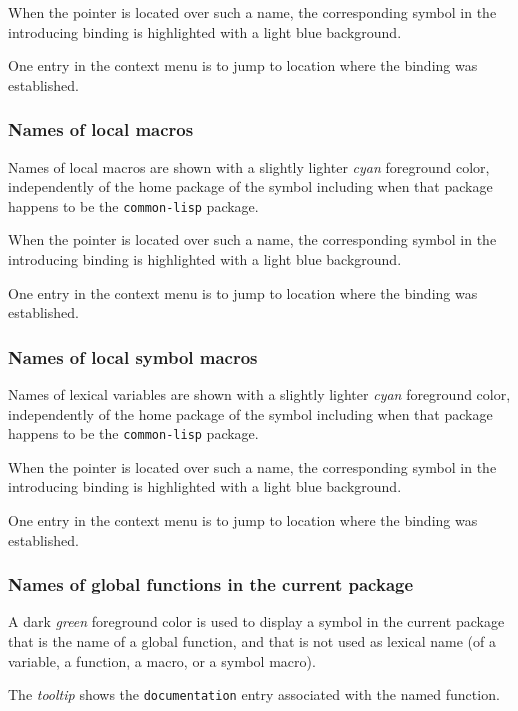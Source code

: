 When the pointer is located over such a name, the corresponding symbol
in the introducing binding is highlighted with a light blue
background. 

One entry in the context menu is to jump to location where the binding
was established. 

\subsubsection{Names of local macros}

Names of local macros are shown with a slightly lighter \emph{cyan}
foreground color, independently of the home package of the symbol
including when that package happens to be the \texttt{common-lisp}
package.

When the pointer is located over such a name, the corresponding symbol
in the introducing binding is highlighted with a light blue
background. 

One entry in the context menu is to jump to location where the binding
was established. 

\subsubsection{Names of local symbol macros}

Names of lexical variables are shown with a slightly lighter
\emph{cyan} foreground color, independently of the home package of the
symbol including when that package happens to be the
\texttt{common-lisp} package.

When the pointer is located over such a name, the corresponding symbol
in the introducing binding is highlighted with a light blue
background. 

One entry in the context menu is to jump to location where the binding
was established. 

\subsubsection{Names of global functions in the current package}

A dark \emph{green} foreground color is used to display a symbol in the
current package that is the name of a global function, and that is not
used as lexical name (of a variable, a function, a macro, or a symbol
macro).  

The \emph{tooltip} shows the \texttt{documentation} entry associated
with the named function.


